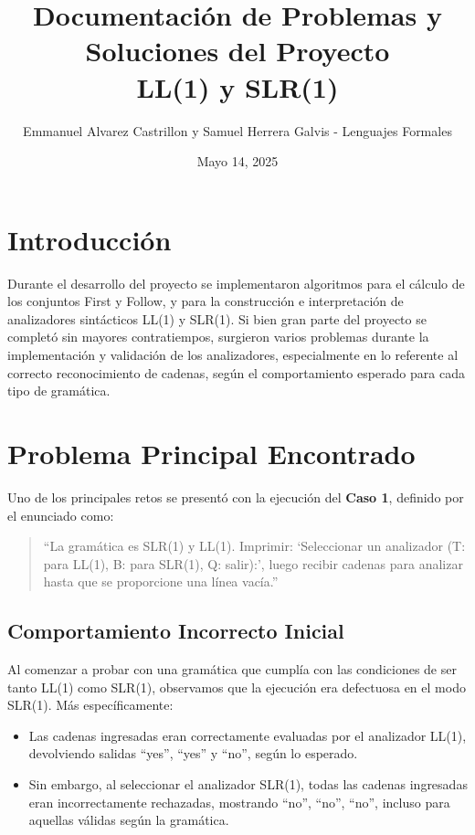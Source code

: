 \documentclass[11pt]{article}
\title{Documentación de Problemas y Soluciones del Proyecto \\ LL(1) y SLR(1)}
\author{Emmanuel Alvarez Castrillon y Samuel Herrera Galvis - Lenguajes Formales}
\date{Mayo 14, 2025}
\begin{document}
\maketitle

\section*{Introducción}

Durante el desarrollo del proyecto se implementaron algoritmos para el cálculo de los conjuntos First y Follow, y para la construcción e interpretación de analizadores sintácticos LL(1) y SLR(1). Si bien gran parte del proyecto se completó sin mayores contratiempos, surgieron varios problemas durante la implementación y validación de los analizadores, especialmente en lo referente al correcto reconocimiento de cadenas, según el comportamiento esperado para cada tipo de gramática.

\section*{Problema Principal Encontrado}

Uno de los principales retos se presentó con la ejecución del \textbf{Caso 1}, definido por el enunciado como:

\begin{quote}
``La gramática es SLR(1) y LL(1). Imprimir: `Seleccionar un analizador (T: para LL(1), B: para SLR(1), Q: salir):', luego recibir cadenas para analizar hasta que se proporcione una línea vacía.''
\end{quote}

\subsection*{Comportamiento Incorrecto Inicial}

Al comenzar a probar con una gramática que cumplía con las condiciones de ser tanto LL(1) como SLR(1), observamos que la ejecución era defectuosa en el modo SLR(1). Más específicamente:

\begin{itemize}
    \item Las cadenas ingresadas eran correctamente evaluadas por el analizador LL(1), devolviendo salidas ``yes'', ``yes'' y ``no'', según lo esperado.
    \item Sin embargo, al seleccionar el analizador SLR(1), todas las cadenas ingresadas eran incorrectamente rechazadas, mostrando ``no'', ``no'', ``no'', incluso para aquellas válidas según la gramática.
\end{itemize}
\end{document}
